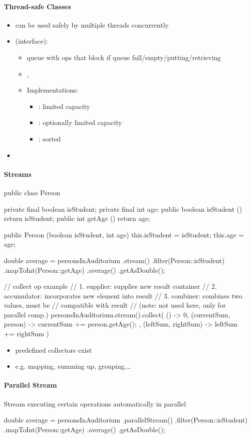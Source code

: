 \paragraph{Thread-safe Classes}
\begin{itemize}
  \item can be used safely by multiple threads concurrently
  \item {} (interface):
  \begin{itemize}
    \item queue with ops that block if queue full/empty/putting/retrieving
    \item {}, 
    \item Implementations:
    \begin{itemize}
      \item {}: limited capacity
      \item {}: optionally limited capacity
      \item {}: sorted
    \end{itemize}
  \end{itemize}
  \item {}
\end{itemize}

\paragraph{Streams}
\begin{java}
  public class Person {
    private final boolean isStudent;
    private final int age;
    public boolean isStudent () { return isStudent; }
    public int getAge () { return age; }

    public Person (boolean isStudent, int age) {
      this.isStudent = isStudent;
      this.age = age;
    }
  }

  double average = personsInAuditorium
    .stream()
    .filter(Person::isStudent)
    .mapToInt(Person::getAge)
    .average()
    .getAsDouble();

  // collect op example
  // 1. supplier: supplies new result container
  // 2. accumulator: incorporates new element into result
  // 3. combiner: combines two values, must be
  //    compatible with result
  //    (note: not used here, only for parallel comp.)
  personsInAuditorium.stream().collect(
    () -> 0,
    (currentSum, person) -> { currentSum += person.getAge(); },
    (leftSum, rightSum) -> { leftSum += rightSum })
\end{java}
\begin{itemize}
  \item predefined collectors exist
  \item e.g. mapping, summing up, grouping,\dots
\end{itemize}

\paragraph{Parallel Stream}
Stream executing certain operations automatically in parallel
\begin{java}
  double average = personsInAuditorium
    .parallelStream()
    .filter(Person::isStudent)
    .mapToInt(Person::getAge)
    .average()
    .getAsDouble();
\end{java}